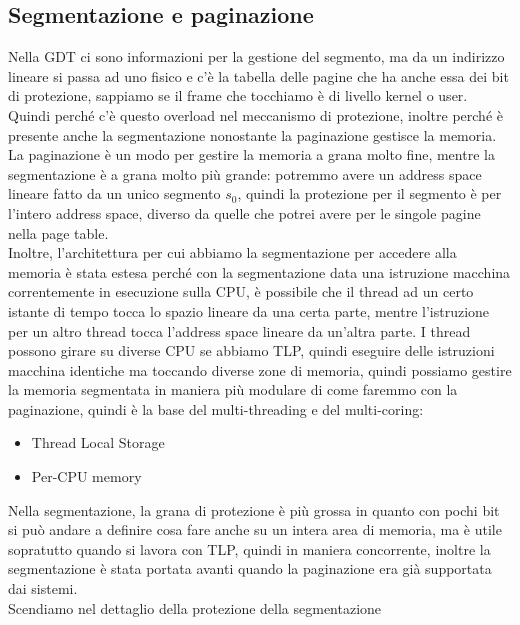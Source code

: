 \documentclass[12pt, oneside]{extbook}
\begin{document}
\subsection{Segmentazione e paginazione}
Nella GDT ci sono informazioni per la gestione del segmento, ma da un indirizzo lineare si passa ad uno fisico e c'è la tabella delle pagine che ha anche essa dei bit di protezione, sappiamo se il frame che tocchiamo è di livello kernel o user. Quindi perché c'è questo overload nel meccanismo di protezione, inoltre perché è presente anche la segmentazione nonostante la paginazione gestisce la memoria. La paginazione è un modo per gestire la memoria a grana molto fine, mentre la segmentazione è a grana molto più grande: potremmo avere un address space lineare fatto da un unico segmento $s_0$, quindi la protezione per il segmento è per l'intero address space, diverso da quelle che potrei avere per le singole pagine nella page table.\\ Inoltre, l'architettura per cui abbiamo la segmentazione per accedere alla memoria è stata estesa perché con la segmentazione data una istruzione macchina correntemente in esecuzione sulla CPU, è possibile che il thread ad un certo istante di tempo tocca lo spazio lineare da una certa parte, mentre l'istruzione per un altro thread tocca l'address space lineare da un'altra parte. I thread possono girare su diverse CPU se abbiamo TLP, quindi eseguire delle istruzioni macchina identiche ma toccando diverse zone di memoria, quindi possiamo gestire la memoria segmentata in maniera più modulare di come faremmo con la paginazione, quindi è la base del multi-threading e del multi-coring:
\begin{itemize}
\item Thread Local Storage
\item Per-CPU memory
\end{itemize}
Nella segmentazione, la grana di protezione è più grossa in quanto con pochi bit si può andare a definire cosa fare anche su un intera area di memoria, ma è utile sopratutto quando si lavora con TLP, quindi in maniera concorrente, inoltre la segmentazione è stata portata avanti quando la paginazione era già supportata dai sistemi.\\ Scendiamo nel dettaglio della protezione della segmentazione
\end{document}
